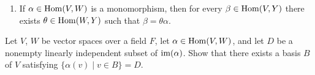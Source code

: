 \begin{problem}[Golan 293 \& 294]
\begin{enumerate}
\item  If $\alpha \in \operatorname{Hom}(V, W)$ is a monomorphism, then 
 for every $\beta \in \operatorname{Hom}(V,Y)$ there exists $\theta \in \operatorname{Hom}(W,Y)$ such that $\beta = \theta \alpha$.

\begin{center}
\end{center}

\end{enumerate}




\end{problem}


\probskip

\begin{problem}[Golan 296]\hskip-2mm\protect\footnotemark
\label{prob:296}
Let $V$, $W$ be vector spaces over a field $F$, let 
$\alpha \in \operatorname{Hom}(V, W)$, and let $D$ be a nonempty linearly independent subset
of $\operatorname{im}(\alpha)$.  Show that there exists a basis $B$ of $V$ satisfying
$\{\alpha(v)\mid v \in B\} = D$.
\end{problem}

